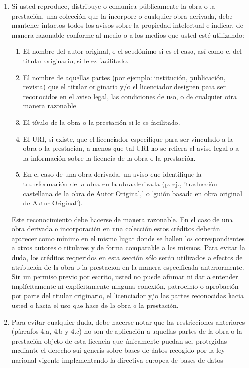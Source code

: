 \begin{enumerate}
          \item Si usted reproduce, distribuye o comunica públicamente la obra o la prestación, una colección que la incorpore o cualquier obra derivada, debe mantener intactos todos los avisos sobre la propiedad intelectual e indicar, de manera razonable conforme al medio o a los medios que usted esté utilizando:
            \begin{enumerate}
		\item El nombre del autor original, o el seudónimo si es el caso, así como el del titular originario, si le es facilitado.
		\item El nombre de aquellas partes (por ejemplo: institución, publicación, revista) que el titular originario y/o el licenciador designen para ser reconocidos en el aviso legal, las condiciones de uso, o de cualquier otra manera razonable.
		\item El  título de la obra o la prestación si le es facilitado.
		\item El URI, si existe, que el licenciador especifique para ser vinculado a la obra o la prestación, a menos que tal URI no se refiera al aviso legal o a la información sobre la licencia de la obra o la prestación.
		\item En el caso de una obra derivada, un aviso que identifique la transformación de la obra en la obra derivada (p. ej., 'traducción castellana de la obra de Autor Original,' o 'guión basado en obra original de Autor Original').
\end{enumerate}
Este reconocimiento debe hacerse de manera razonable. En el caso de una obra derivada o incorporación en una colección estos créditos deberán aparecer como mínimo en el mismo lugar donde se hallen los correspondientes a otros autores o titulares y de forma comparable a los mismos. Para evitar la duda, los créditos requeridos en esta sección sólo serán utilizados a efectos de atribución de la obra o la prestación en la manera especificada anteriormente. Sin un permiso previo por escrito, usted no puede afirmar ni dar a entender implícitamente ni explícitamente ninguna conexión, patrocinio o aprobación por parte del titular originario, el licenciador y/o las partes reconocidas hacia usted o hacia el uso que hace de la obra o la prestación.

          \item Para evitar cualquier duda, debe hacerse notar que las restricciones anteriores (párrafos 4.a, 4.b y 4.c) no son de aplicación a aquellas partes de la obra o la prestación objeto de esta licencia que únicamente puedan ser protegidas mediante el derecho sui generis sobre bases de datos recogido por la ley nacional vigente implementando la directiva europea de bases de datos

         
 \end{enumerate}

